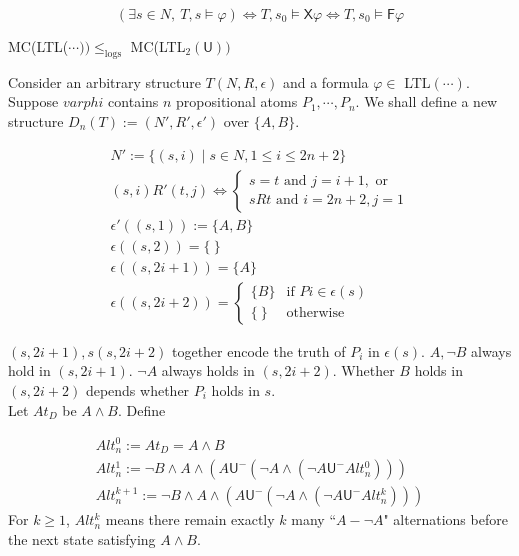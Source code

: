 \documentclass[12pt]{article}
\begin{document}
\begin{CJK*}{GBK}{song}
$$(\exists s\in N,\ T,s\models \varphi) \Longleftrightarrow T,s_0\models \textsf{X}\varphi\Longleftrightarrow T,s_0\models\textsf{F}\varphi$$


MC(LTL($\cdots))\leq_{\text{logs}}$ MC(LTL$_2(\textsf{U}))$ 

Consider an arbitrary structure $T(N,R,\epsilon)$ and a formula $\varphi\in$ LTL$(\cdots)$. Suppose $varphi$ contains $n$ propositional atoms $P_1,\cdots, P_n$. 
We shall define a new structure $D_n(T):=(N',R',\epsilon')$ over $\{A,B\}$.

$$\begin{array}{l}
N':=\{(s,i)\mid s\in N, 1\leq i\leq 2n+2\}\\

(s,i)R'(t,j) \Longleftrightarrow\left\{\begin{array}{l}
s=t \mbox{ and } j=i+1, \mbox{ or }\\
sRt \mbox{ and } i=2n+2, j=1
\end{array}\right.\\
\epsilon'((s,1)):=\{A,B\}\\
\epsilon((s,2))=\{\ \}\\
\epsilon((s,2i+1))=\{A\}\\
\epsilon((s,2i+2))=\left\{\begin{array}{ll}
\{B\} & \mbox{if } Pi\in \epsilon(s)\\
\{\ \} & \mbox{otherwise}
\end{array}\right.
\end{array}
$$

$(s,2i+1), s(s,2i+2)$ together encode the truth of $P_i$ in $\epsilon(s)$. 
%
$A, \neg B$ always hold in $(s,2i+1)$. $\neg A$ always holds in $(s,2i+2)$. Whether $B$ holds in $(s,2i+2)$ depends whether $P_i$ holds in $s$. \\


Let $At_D$ be $A\wedge B$. Define 

$$\begin{array}{l}
Alt^0_n:=At_D=A\wedge B\\
Alt^1_n:=\neg B\wedge A\wedge\left(A\textsf{U}^-\left(\neg A\wedge\left(\neg A\textsf{U}^-Alt_n^0\right)\right)\right)\\
Alt^{k+1}_n:=\neg B\wedge A\wedge\left(A\textsf{U}^-\left(\neg A\wedge\left(\neg A\textsf{U}^-Alt_n^k\right)\right)\right)
\end{array}$$
%
For $k\geq 1$, $Alt^k_n$ means there remain exactly $k$ many ``$A-\neg A$" alternations before the next state satisfying $A\wedge B$.\\


\end{CJK*}
\end{document}
